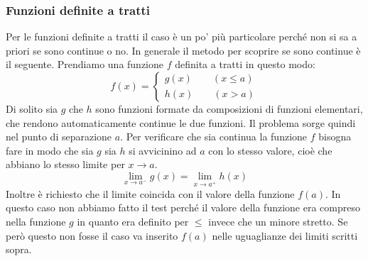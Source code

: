 \subsubsection{Funzioni definite a tratti}
Per le funzioni definite a tratti il caso è un po' più particolare perché non si sa a priori se sono continue o no. In generale il metodo per scoprire se sono continue è il seguente. Prendiamo una funzione $f$ definita a tratti in questo modo:
\begin{equation*}
    f(x) =
    \begin{cases*}
        g(x) \qquad (x \leq a)\\
        h(x) \qquad (x > a)
    \end{cases*}
\end{equation*}
Di solito sia $g$ che $h$ sono funzioni formate da composizioni di funzioni elementari, che rendono automaticamente continue le due funzioni. Il problema sorge quindi nel punto di separazione $a$. Per verificare che sia continua la funzione $f$ bisogna fare in modo che sia $g$ sia $h$ si avvicinino ad $a$ con lo stesso valore, cioè che abbiano lo stesso limite per $x \to a$.
\begin{equation*}
    \lim_{x \to a^-} g(x) = \lim_{x \to a^+} h(x)
\end{equation*}
Inoltre è richiesto che il limite coincida con il valore della funzione $f(a)$. In questo caso non abbiamo fatto il test perché il valore della funzione era compreso nella funzione $g$ in quanto era definito per $\leq$ invece che un minore stretto. Se però questo non fosse il caso va inserito $f(a)$ nelle uguaglianze dei limiti scritti sopra.
